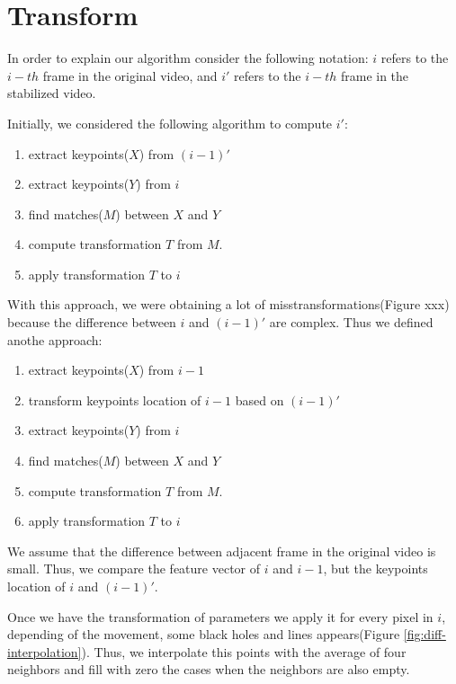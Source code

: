 \section{Transform}

In order to explain our algorithm consider the following notation: $i$ refers to the $i-th$ frame in the original video, and $i'$ refers to the $i-th$ frame in the stabilized video.

Initially, we considered the following algorithm to compute $i'$:
\begin{enumerate}
	\item extract keypoints($X$) from $(i-1)'$
	\item extract keypoints($Y$) from $i$
	\item find matches($M$) between $X$ and $Y$
	\item compute transformation $T$ from $M$.
	\item apply transformation $T$ to $i$
\end{enumerate}

With this approach, we were obtaining a lot of misstransformations(Figure xxx) because the difference between $i$ and $(i-1)'$ are complex. Thus we defined anothe approach:   

\begin{enumerate}
	\item extract keypoints($X$) from $i-1$
	\item transform keypoints location of $i-1$ based on $(i-1)'$
	\item extract keypoints($Y$) from $i$
	\item find matches($M$) between $X$ and $Y$
	\item compute transformation $T$ from $M$.
	\item apply transformation $T$ to $i$
\end{enumerate}

We assume that the difference between adjacent frame in the original video is small. Thus, we compare the feature vector of $i$ and $i-1$, but the keypoints location of $i$ and $(i-1)'$.

Once we have the transformation of parameters we apply it for every pixel in $i$, depending of the movement, some black holes and lines appears(Figure \ref{fig:diff-interpolation}). Thus, we interpolate this points with the average of four neighbors and fill with zero the cases when the neighbors are also empty.

